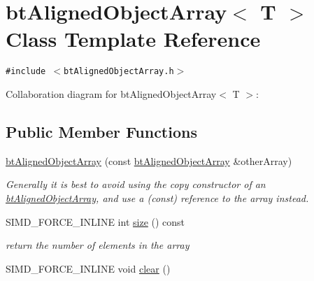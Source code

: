 \hypertarget{classbt_aligned_object_array}{
\section{btAlignedObjectArray$<$ T $>$ Class Template Reference}
\label{classbt_aligned_object_array}
}
{\tt \#include $<$btAlignedObjectArray.h$>$}

Collaboration diagram for btAlignedObjectArray$<$ T $>$:\subsection*{Public Member Functions}
\begin{CompactItemize}
\item 
\hypertarget{classbt_aligned_object_array_e91d1383db8069a02d23caf915bc2ce3}{
\hyperlink{classbt_aligned_object_array_e91d1383db8069a02d23caf915bc2ce3}{btAlignedObjectArray} (const \hyperlink{classbt_aligned_object_array}{btAlignedObjectArray} \&otherArray)}
\label{classbt_aligned_object_array_e91d1383db8069a02d23caf915bc2ce3}

\begin{CompactList}\small\item\em Generally it is best to avoid using the copy constructor of an \hyperlink{classbt_aligned_object_array}{btAlignedObjectArray}, and use a (const) reference to the array instead. \item\end{CompactList}\item 
\hypertarget{classbt_aligned_object_array_6bdd14c7599ecb95e8d83dd5a715f9b7}{
SIMD\_\-FORCE\_\-INLINE int \hyperlink{classbt_aligned_object_array_6bdd14c7599ecb95e8d83dd5a715f9b7}{size} () const }
\label{classbt_aligned_object_array_6bdd14c7599ecb95e8d83dd5a715f9b7}

\begin{CompactList}\small\item\em return the number of elements in the array \item\end{CompactList}\item 
\hypertarget{classbt_aligned_object_array_12123db01dda7758f0df5e3bba10cc0a}{
SIMD\_\-FORCE\_\-INLINE void \hyperlink{classbt_aligned_object_array_12123db01dda7758f0df5e3bba10cc0a}{clear} ()}
\label{classbt_aligned_object_array_12123db01dda7758f0df5e3bba10cc0a}


\end{CompactItemize}
